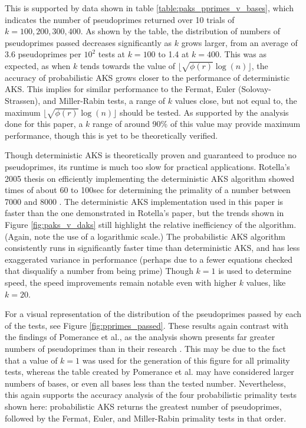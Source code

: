 \documentclass{article}
\begin{document}
This is supported by data shown in table \ref{table:paks_pprimes_v_bases}, which indicates the number of pseudoprimes returned over 10 trials of $k = 100, 200, 300, 400$. As shown by the table, the distribution of numbers of pseudoprimes passed decreases significantly as $k$ grows larger, from an average of 3.6 pseudoprimes per $10^2$ tests at $k = 100$ to 1.4 at $k=400$. This was as expected, as when $k$ tends towards the value of $\lfloor \sqrt{\phi(r)}\log(n) \rfloor$, the accuracy of probabilistic AKS grows closer to the performance of deterministic AKS. This implies for similar performance to the Fermat, Euler (Solovay-Strassen), and Miller-Rabin tests, a range of $k$ values close, but not equal to, the maximum $\lfloor \sqrt{\phi(r)}\log(n) \rfloor$ should be tested. As supported by the analysis done for this paper, a $k$ range of around 90\% of this value may provide maximum performance, though this is yet to be theoretically verified.

Though deterministic AKS is theoretically proven and guaranteed to produce no pseudoprimes, its runtime is much too slow for practical applications. Rotella's 2005 thesis on efficiently implementing the deterministic AKS algorithm showed times of about 60 to 100sec for determining the primality of a number between 7000 and 8000 \cite{rotella_efficient_2005}. The deterministic AKS implementation used in this paper is faster than the one demonstrated in Rotella's paper, but the trends shown in Figure \ref{fig:paks_v_daks} still highlight the relative inefficiency of the algorithm. (Again, note the use of a logarithmic scale.) The probabilistic AKS algorithm consistently runs in significantly faster time than deterministic AKS, and has less exaggerated variance in performance (perhaps due to a fewer equations checked that disqualify a number from being prime) Though $k=1$ is used to determine speed, the speed improvements remain notable even with higher $k$ values, like $k=20$.

For a visual representation of the distribution of the pseudoprimes passed by each of the tests, see Figure \ref{fig:pprimes_passed}. These results again contrast with the findings of Pomerance et al., as the analysis shown presents far greater numbers of pseudoprimes than in their research \cite{pomerance_pseudoprimes_1980}. This may be due to the fact that a value of $k=1$ was used for the generation of this figure for all primality tests, whereas the table created by Pomerance et al. may have considered larger numbers of bases, or even all bases less than the tested number. Nevertheless, this again supports the accuracy analysis of the four probabilistic primality tests shown here: probabilistic AKS returns the greatest number of pseudoprimes, followed by the Fermat, Euler, and Miller-Rabin primality tests in that order. 
\end{document}
